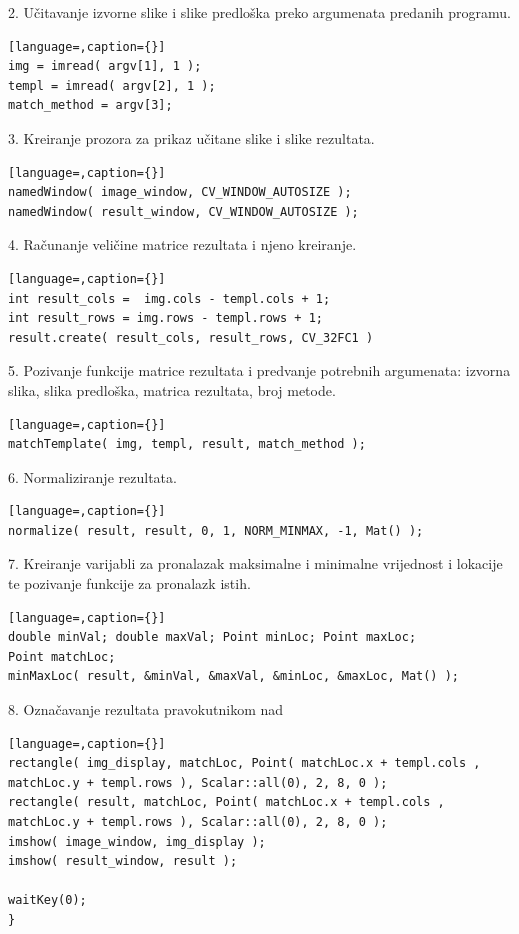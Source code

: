 2. Učitavanje izvorne slike i slike predloška preko argumenata predanih
programu.
\begin{lstlisting}[language=,caption={}]
img = imread( argv[1], 1 );
templ = imread( argv[2], 1 );
match_method = argv[3];
\end{lstlisting}

3. Kreiranje prozora za prikaz učitane slike i slike rezultata.
\begin{lstlisting}[language=,caption={}]
namedWindow( image_window, CV_WINDOW_AUTOSIZE );
namedWindow( result_window, CV_WINDOW_AUTOSIZE );
\end{lstlisting}

4. Računanje veličine matrice rezultata i njeno kreiranje.
\begin{lstlisting}[language=,caption={}]
int result_cols =  img.cols - templ.cols + 1;
int result_rows = img.rows - templ.rows + 1;
result.create( result_cols, result_rows, CV_32FC1 )
\end{lstlisting}

5. Pozivanje funkcije matrice rezultata i predvanje potrebnih
argumenata: izvorna slika, slika predloška, matrica rezultata, broj
metode.
\begin{lstlisting}[language=,caption={}]
matchTemplate( img, templ, result, match_method );
\end{lstlisting}

6. Normaliziranje rezultata.
\begin{lstlisting}[language=,caption={}]
normalize( result, result, 0, 1, NORM_MINMAX, -1, Mat() );
\end{lstlisting}

7. Kreiranje varijabli za pronalazak maksimalne i minimalne vrijednost i
lokacije te pozivanje funkcije za pronalazk istih.
\begin{lstlisting}[language=,caption={}]
double minVal; double maxVal; Point minLoc; Point maxLoc;
Point matchLoc;
minMaxLoc( result, &minVal, &maxVal, &minLoc, &maxLoc, Mat() );
\end{lstlisting}

8. Označavanje rezultata pravokutnikom nad 
\begin{lstlisting}[language=,caption={}]
rectangle( img_display, matchLoc, Point( matchLoc.x + templ.cols , matchLoc.y + templ.rows ), Scalar::all(0), 2, 8, 0 );
rectangle( result, matchLoc, Point( matchLoc.x + templ.cols , matchLoc.y + templ.rows ), Scalar::all(0), 2, 8, 0 );
imshow( image_window, img_display );
imshow( result_window, result );

waitKey(0);
}
\end{lstlisting}


